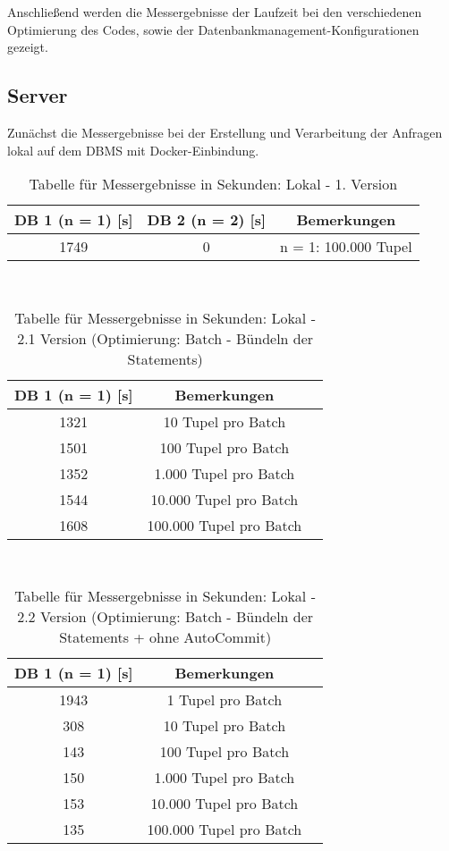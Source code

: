 Anschließend werden die Messergebnisse der Laufzeit bei den verschiedenen Optimierung des Codes, sowie der Datenbankmanagement-Konfigurationen gezeigt.

\subsection{Server}\label{subsec:server}
Zunächst die Messergebnisse bei der Erstellung und Verarbeitung der Anfragen lokal auf dem DBMS mit Docker-Einbindung.
\begin{table}[h!]
    \centering
    \begin{tabular}{|c|c|c|}
        \hline
        DB 1 (n = 1) [s] & DB 2 (n = 2) [s] & Bemerkungen \\  \hline
        1749 & 0 & n = 1: 100.000 Tupel \\ \hline
    \end{tabular}
    \caption{Tabelle für Messergebnisse in Sekunden: Lokal - 1. Version}
    \label{tab:5}
\end{table} \\

\begin{table}[h!]
    \centering
    \begin{tabular}{|c|c|c|}
        \hline
        DB 1 (n = 1) [s] & Bemerkungen \\  \hline
        1321 & 10 Tupel pro Batch \\ \hline
        1501 & 100 Tupel pro Batch \\ \hline
        1352 & 1.000 Tupel pro Batch \\ \hline
        1544 & 10.000 Tupel pro Batch \\ \hline
        1608 & 100.000 Tupel pro Batch \\ \hline
    \end{tabular}
    \caption{Tabelle für Messergebnisse in Sekunden: Lokal - 2.1 Version (Optimierung: Batch - Bündeln der Statements)}
    \label{tab:6}
\end{table} \\

\begin{table}[h!]
    \centering
    \begin{tabular}{|c|c|c|}
        \hline
        DB 1 (n = 1) [s] & Bemerkungen \\  \hline
        1943 & 1 Tupel pro Batch \\ \hline
        308 & 10 Tupel pro Batch \\ \hline
        143 & 100 Tupel pro Batch \\ \hline
        150 & 1.000 Tupel pro Batch \\ \hline
        153 & 10.000 Tupel pro Batch \\ \hline
        135 & 100.000 Tupel pro Batch \\ \hline
    \end{tabular}
    \caption{Tabelle für Messergebnisse in Sekunden: Lokal - 2.2 Version (Optimierung: Batch - Bündeln der Statements + ohne AutoCommit)}
    \label{tab:7}
\end{table} \\

